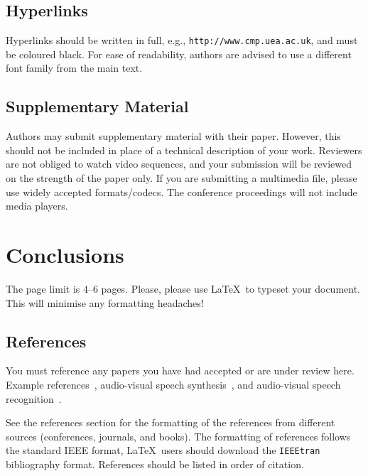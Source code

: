 \documentclass{cmppgr}
\begin{document}
\subsection{Hyperlinks}

Hyperlinks should be written in full, e.g., \texttt{http://www.cmp.uea.ac.uk}, and must be coloured black. For ease of readability, authors are advised to use a different font family from the main text.

\subsection{Supplementary Material}

Authors may submit supplementary material with their paper. However, this should not be included in place of a technical description of your work. Reviewers are not obliged to watch video sequences, and your submission will be reviewed on the strength of the paper only. If you are submitting a multimedia file, please use widely accepted formats/codecs. The conference proceedings will not include media players.

\section{Conclusions}

The page limit is 4--6 pages. Please, please use \LaTeX\ to typeset your document. This will minimise any formatting headaches!

\subsection{References}

You must reference any papers you have had accepted or are under review here. Example references~\cite{massaro98:perceiving}, audio-visual speech synthesis~\cite{theobald04:specomm,theobald08:lips}, and audio-visual speech recognition~\cite{cox08:avsp,matthews2002:extraction}.

See the references section for the formatting of the references from different sources (conferences, journals, and books). The formatting of references follows the standard IEEE format, \LaTeX\ users should download the \texttt{IEEEtran} bibliography format. References should be listed in order of citation.



\end{document}
